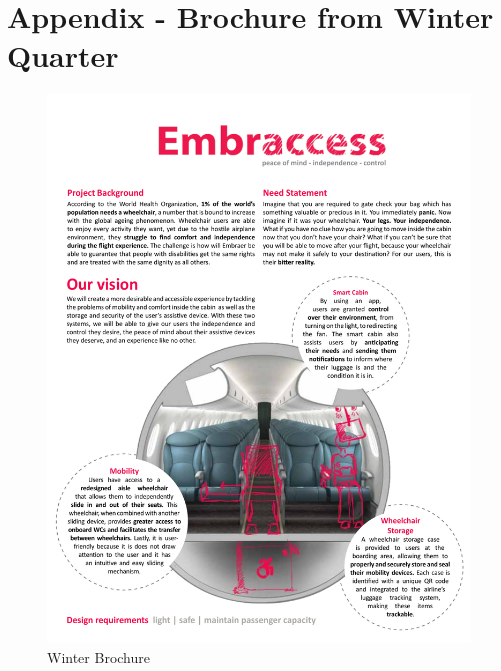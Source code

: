 

\chapter{Appendix - Brochure from Winter Quarter}

\begin{figure}[h!]
	\centering
		\includegraphics[width=1\textwidth, page=1]{Figures/Winter_Brochure.pdf}
		\caption{Winter Brochure}
		\label{fig:wbrochure}
\end{figure}
